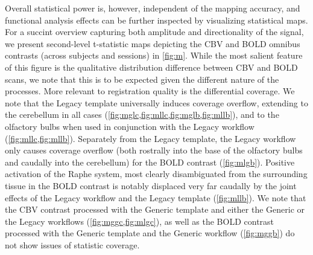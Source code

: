 Overall statistical power is, however, independent of the mapping accuracy, and functional analysis effects can be further inspected by visualizing statistical maps.
For a succint overview capturing both amplitude and directionality of the signal, we present second-level t-statistic maps depicting the CBV and BOLD omnibus contrasts (across subjects and sessions) in \cref{fig:m}.
While the most salient feature of this figure is the qualitative distribution difference between CBV and BOLD scans, we note that this is to be expected given the different nature of the processes.
More relevant to registration quality is the differential coverage.
We note that the Legacy template universally induces coverage overflow, extending to the cerebellum in all cases (\cref{fig:mglc,fig:mllc,fig:mglb,fig:mllb}), and to the olfactory bulbs when used in conjunction with the Legacy workflow (\cref{fig:mllc,fig:mllb}).
Separately from the Legacy template, the Legacy workflow only causes coverage overflow (both rostrally into the base of the olfactory bulbs and caudally into the cerebellum) for the BOLD contrast (\cref{fig:mlgb}).
Positive activation of the Raphe system, most clearly disambiguated from the surrounding tissue in the BOLD contrast is notably displaced very far caudally by the joint effects of the Legacy workflow and the Legacy template (\cref{fig:mllb}).
We note that the CBV contrast processed with the Generic template and either the Generic or the Legacy workflows (\cref{fig:mggc,fig:mlgc}), as well as the BOLD contrast processed with the Generic template and the Generic workflow (\cref{fig:mggb}) do not show issues of statistic coverage.

